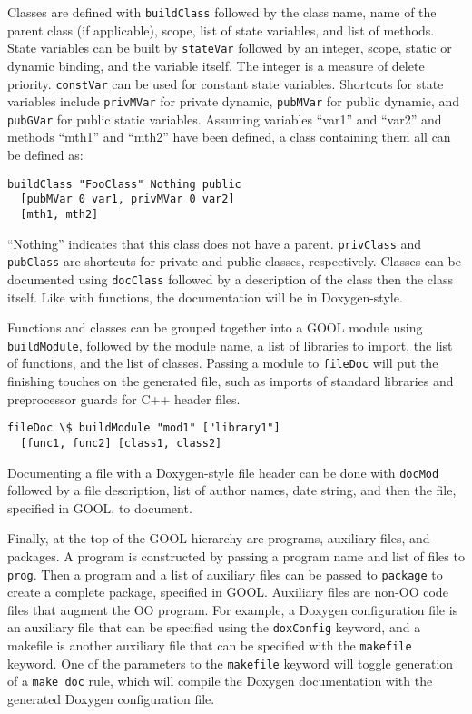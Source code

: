 \documentclass[sigplan,review,anonymous,prologue,dvipsnames]{acmart}
\begin{document}
Classes are defined with \verb|buildClass| followed by the class name, name of 
the parent class (if applicable), scope, list of state variables, and list of 
methods. State variables can be built by \verb|stateVar| followed by an 
integer, scope, static or dynamic binding, and the variable itself. The integer 
is a measure of delete priority. \verb|constVar| can be used for constant state 
variables. Shortcuts for state variables include \verb|privMVar| for private 
dynamic, \verb|pubMVar| for public dynamic, and \verb|pubGVar| for public 
static variables. Assuming variables ``var1'' and ``var2'' and methods ``mth1'' 
and ``mth2'' have been defined, a class containing them all can be defined as:
\begin{lstlisting}
buildClass "FooClass" Nothing public 
  [pubMVar 0 var1, privMVar 0 var2] 
  [mth1, mth2]
\end{lstlisting}
``Nothing'' indicates that this class does not have a parent. \verb|privClass| 
and \verb|pubClass| are shortcuts for private and public classes, respectively. 
Classes can be documented using \verb|docClass| followed by a description of 
the class then the class itself. Like with functions, the documentation will be 
in Doxygen-style.

Functions and classes can be grouped together into a GOOL module using 
\verb|buildModule|, followed by the module name, a list of libraries to import, 
the list of functions, and the list of classes. Passing a module to 
\verb|fileDoc| will put the finishing touches on the generated file, such as 
imports of standard libraries and preprocessor guards for C++ header files.
\begin{lstlisting}
fileDoc \$ buildModule "mod1" ["library1"] 
  [func1, func2] [class1, class2] 
\end{lstlisting}
Documenting a file with a Doxygen-style file header can be done with 
\verb|docMod| followed by a file description, list of author names, date 
string, and then the file, specified in GOOL,  to document.

Finally, at the top of the GOOL hierarchy are programs, auxiliary files, and 
packages. A program is constructed by passing a program name and list of files 
to \verb|prog|. Then a program and a list of auxiliary files can be passed to 
\verb|package| to create a complete package, specified in GOOL. Auxiliary files 
are non-OO code files that augment the OO program. For example, a Doxygen 
configuration file is an auxiliary file that can be specified using the 
\verb|doxConfig| keyword, and a makefile is another auxiliary file that can be 
specified with the \verb|makefile| keyword. One of the parameters to the 
\verb|makefile| keyword will toggle generation of a \verb|make doc| rule, which 
will compile the Doxygen documentation with the generated Doxygen configuration 
file.
\end{document}
